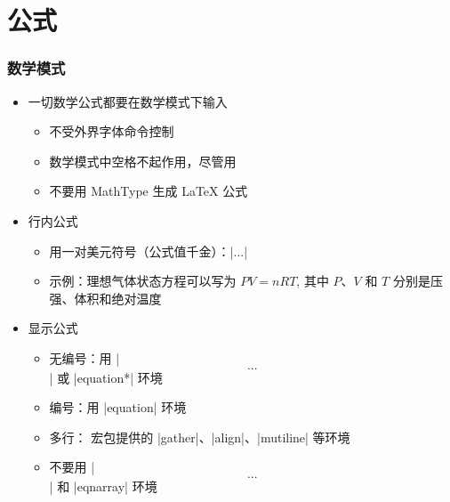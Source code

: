 \section{公式}

\begin{frame}[fragile]
\frametitle{数学模式}
\begin{itemize}
  \item 一切数学公式都要在数学模式下输入
    \begin{itemize}
      \item 不受外界字体命令控制
      \item 数学模式中空格不起作用，尽管用
      \item \alert{不要用 MathType 生成 \LaTeX{} 公式}
    \end{itemize}
  \item 行内公式
    \begin{itemize}
      \item 用一对美元符号（公式值千金）：|$...$|
      \item 示例：理想气体状态方程可以写为 \alert{$PV=nRT$}, 其中
            \alert{$P$}、\alert{$V$} 和 \alert{$T$} 分别是压强、体积和绝对温度
    \end{itemize}
  \item 显示公式
    \begin{itemize}
      \item 无编号：用 |\[...\]| 或 |equation*| 环境
      \item 编号：用 |equation| 环境
      \item 多行： 宏包提供的 |gather|、|align|、|mutiline| 等环境
      \item \alert{不要用} |$$...$$| \alert{和} |eqnarray| \alert{环境}
    \end{itemize}
\end{itemize}
\end{frame}

